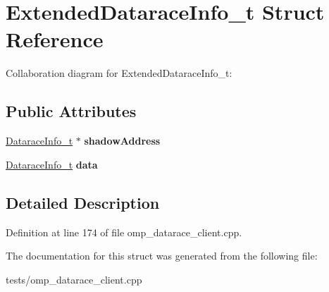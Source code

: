 \hypertarget{structExtendedDataraceInfo__t}{\section{Extended\-Datarace\-Info\-\_\-t Struct Reference}
\label{structExtendedDataraceInfo__t}
}


Collaboration diagram for Extended\-Datarace\-Info\-\_\-t\-:
\subsection*{Public Attributes}
\begin{DoxyCompactItemize}
\item 
\hypertarget{structExtendedDataraceInfo__t_a32fc1f93f6fcc1491d1a521dfdb150a6}{\hyperlink{structDataraceInfo__t}{Datarace\-Info\-\_\-t} $\ast$ {\bfseries shadow\-Address}}\label{structExtendedDataraceInfo__t_a32fc1f93f6fcc1491d1a521dfdb150a6}

\item 
\hypertarget{structExtendedDataraceInfo__t_a5fbba0750ba4d2ef0571f9d38a69a874}{\hyperlink{structDataraceInfo__t}{Datarace\-Info\-\_\-t} {\bfseries data}}\label{structExtendedDataraceInfo__t_a5fbba0750ba4d2ef0571f9d38a69a874}

\end{DoxyCompactItemize}


\subsection{Detailed Description}


Definition at line 174 of file omp\-\_\-datarace\-\_\-client.\-cpp.



The documentation for this struct was generated from the following file\-:\begin{DoxyCompactItemize}
\item 
tests/omp\-\_\-datarace\-\_\-client.\-cpp\end{DoxyCompactItemize}
